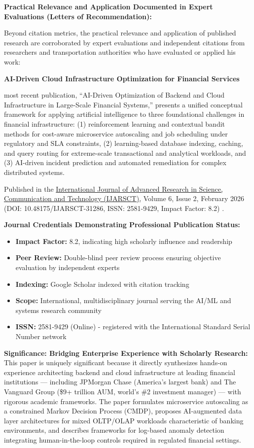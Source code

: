 \textbf{Practical Relevance and Application Documented in Expert Evaluations (Letters of Recommendation):}

Beyond citation metrics, the practical relevance and application of \drs published research are corroborated by expert evaluations and independent citations from researchers and transportation authorities who have evaluated or applied his work:

\textbf{AI-Driven Cloud Infrastructure Optimization for Financial Services}

\drs most recent publication, ``AI-Driven Optimization of Backend and Cloud Infrastructure in Large-Scale Financial Systems,'' presents a unified conceptual framework for applying artificial intelligence to three foundational challenges in financial infrastructure: (1) reinforcement learning and contextual bandit methods for cost-aware microservice autoscaling and job scheduling under regulatory and SLA constraints, (2) learning-based database indexing, caching, and query routing for extreme-scale transactional and analytical workloads, and (3) AI-driven incident prediction and automated remediation for complex distributed systems.

Published in the \underline{International Journal of Advanced Research in Science,}\\ \underline{Communication and Technology (IJARSCT)}, Volume 6, Issue 2, February 2026 (DOI: 10.48175/IJARSCT-31286, ISSN: 2581-9429, Impact Factor: 8.2) \cite{SR10}.

\textbf{Journal Credentials Demonstrating Professional Publication Status:}
\begin{itemize}
    \item \textbf{Impact Factor:} 8.2, indicating high scholarly influence and readership
    \item \textbf{Peer Review:} Double-blind peer review process ensuring objective evaluation by independent experts
    \item \textbf{Indexing:} Google Scholar indexed with citation tracking
    \item \textbf{Scope:} International, multidisciplinary journal serving the AI/ML and systems research community
    \item \textbf{ISSN:} 2581-9429 (Online) - registered with the International Standard Serial Number network
\end{itemize}

\textbf{Significance: Bridging Enterprise Experience with Scholarly Research:} This paper is uniquely significant because it directly synthesizes \drs hands-on experience architecting backend and cloud infrastructure at leading financial institutions --- including JPMorgan Chase (America's largest bank) and The Vanguard Group (\$9+ trillion AUM, world's \#2 investment manager) --- with rigorous academic frameworks. The paper formulates microservice autoscaling as a constrained Markov Decision Process (CMDP), proposes AI-augmented data layer architectures for mixed OLTP/OLAP workloads characteristic of banking environments, and describes frameworks for log-based anomaly detection integrating human-in-the-loop controls required in regulated financial settings.

